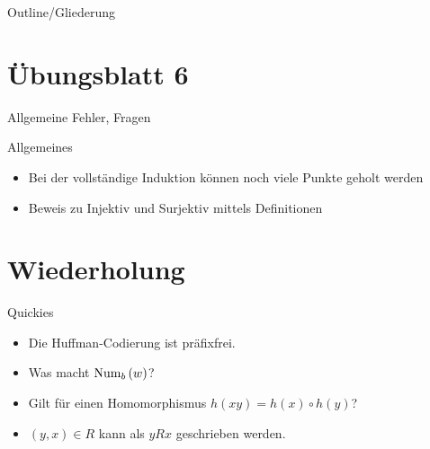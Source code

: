 
\subtitle{Foliensatz 7}
\date{6. Dezember 2012}



\begin{frame}
    \titlepage
\end{frame}

\begin{frame}{Outline/Gliederung}
    \tableofcontents
\end{frame}

\section{Übungsblatt 6}
\begin{frame}{Allgemeine Fehler, Fragen}
    \begin{block}{Allgemeines}
        \begin{itemize}
            \item Bei der vollständige Induktion können noch viele Punkte geholt werden
            \item Beweis zu Injektiv und Surjektiv mittels Definitionen
        \end{itemize}
    \end{block}
\end{frame}

\section{Wiederholung}
\begin{frame}{Quickies}
    \begin{itemize}
        \item Die Huffman-Codierung ist präfixfrei.  
        \item Was macht $\Num2_b\left( w \right)$?
        \item Gilt für einen Homomorphismus $h\left( xy \right) = h\left( x \right)\circ h\left( y \right)$? 
        \item $\left( y,x \right) \in R$ kann als $yRx$ geschrieben werden.
    \end{itemize}
\end{frame}

